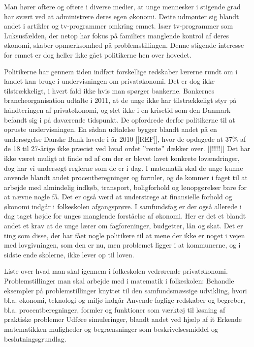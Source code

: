 Man hører oftere og oftere i diverse medier, at unge mennesker i stigende grad har svært ved at administrere deres egen økonomi. Dette udmønter sig blandt andet i artikler og tv-programmer omkring emnet. Især tv-programmer som Luksusfælden, der netop har fokus på familiers manglende kontrol af deres økonomi, skaber opmærksomhed på problemstillingen. Denne stigende interesse for emnet er dog heller ikke gået politikerne hen over hovedet.

Politikerne har gennem tiden indført forskellige redskaber lærerne rundt om i landet kan bruge i undervisningen om privatøkonomi. Det er dog ikke tilstrækkeligt, i hvert fald ikke hvis man spørger bankerne. Bankernes brancheorganisation udtalte i 2011, at de unge ikke har tilstrækkeligt styr på håndteringen af privatøkonomi, og slet ikke i en krisetid som den Danmark befandt sig i på daværende tidspunkt. De opfordrede derfor politikerne til at opruste undervisningen. En sådan udtalelse bygger blandt andet på en undersøgelse Danske Bank lavede i år 2010 [[REF]], hvor de opdagede at 37\% af de 18 til 27-årige ikke præcist ved hvad ordet ”rente” dækker over. [[!!!!!]] Det har ikke været muligt at finde ud af om der er blevet lavet konkrete lovændringer, dog har vi undersøgt reglerne som de er i dag. I matematik skal de unge kunne anvende blandt andet procentberegninger og formler, og de kommer i faget til at arbejde med almindelig indkøb, transport, boligforhold og lønopgørelser bare for at nævne nogle få. Det er også værd at understrege at finansielle forhold og økonomi indgår i folkeskolen afgangsprøve. I samfundsfag er der også allerede i dag taget højde for unges manglende forståelse af økonomi. Her er det et blandt andet et krav at de unge lærer om fagforeninger, budgetter, lån og skat. Det er ting som disse, der har fået nogle politikere til at mene der ikke er noget i vejen med lovgivningen, som den er nu, men problemet ligger i at kommunerne, og i sidste ende skolerne, ikke lever op til loven.

Liste over hvad man skal igennem i folkeskolen vedrørende privatøkonomi.
Problemstillinger man skal arbejde med i matematik i folkeskolen:
Behandle eksempler på problemstillinger knyttet til den samfundsmæssige udvikling, hvori bl.a. økonomi, teknologi og miljø indgår
Anvende faglige redskaber og begreber, bl.a. procentberegninger, formler og funktioner som værktøj til løsning af praktiske problemer
Udføre simuleringer, blandt andet ved hjælp af it
Erkende matematikken muligheder og begrænsninger som beskrivelsesmiddel og beslutningsgrundlag.

